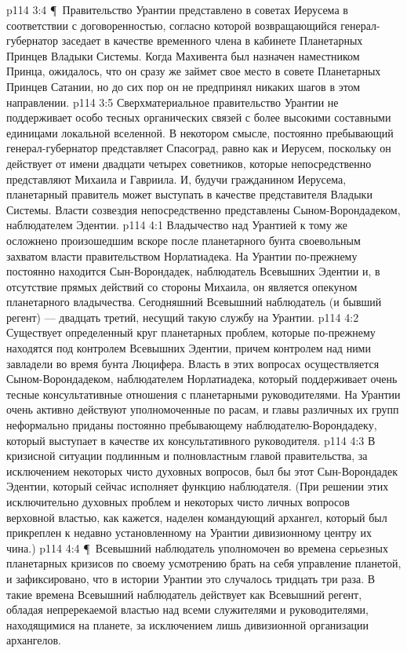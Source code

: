 \vs p114 3:4 \P\ Правительство Урантии представлено в советах Иерусема в соответствии с договоренностью, согласно которой возвращающийся генерал\hyp{}губернатор заседает в качестве временного члена в кабинете Планетарных Принцев Владыки Системы. Когда Махивента был назначен наместником Принца, ожидалось, что он сразу же займет свое место в совете Планетарных Принцев Сатании, но до сих пор он не предпринял никаких шагов в этом направлении.
\vs p114 3:5 Сверхматериальное правительство Урантии не поддерживает особо тесных органических связей с более высокими составными единицами локальной вселенной. В некотором смысле, постоянно пребывающий генерал\hyp{}губернатор представляет Спасоград, равно как и Иерусем, поскольку он действует от имени двадцати четырех советников, которые непосредственно представляют Михаила и Гавриила. И, будучи гражданином Иерусема, планетарный правитель может выступать в качестве представителя Владыки Системы. Власти созвездия непосредственно представлены Сыном\hyp{}Ворондадеком, наблюдателем Эдентии.
\vs p114 4:1 Владычество над Урантией к тому же осложнено произошедшим вскоре после планетарного бунта своевольным захватом власти правительством Норлатиадека. На Урантии по\hyp{}прежнему постоянно находится Сын\hyp{}Ворондадек, наблюдатель Всевышних Эдентии и, в отсутствие прямых действий со стороны Михаила, он является опекуном планетарного владычества. Сегодняшний Всевышний наблюдатель (и бывший регент) --- двадцать третий, несущий такую службу на Урантии.
\vs p114 4:2 Существует определенный круг планетарных проблем, которые по\hyp{}прежнему находятся под контролем Всевышних Эдентии, причем контролем над ними завладели во время бунта Люцифера. Власть в этих вопросах осуществляется Сыном\hyp{}Ворондадеком, наблюдателем Норлатиадека, который поддерживает очень тесные консультативные отношения с планетарными руководителями. На Урантии очень активно действуют уполномоченные по расам, и главы различных их групп неформально приданы постоянно пребывающему наблюдателю\hyp{}Ворондадеку, который выступает в качестве их консультативного руководителя.
\vs p114 4:3 В кризисной ситуации подлинным и полновластным главой правительства, за исключением некоторых чисто духовных вопросов, был бы этот Сын\hyp{}Ворондадек Эдентии, который сейчас исполняет функцию наблюдателя. (При решении этих исключительно духовных проблем и некоторых чисто личных вопросов верховной властью, как кажется, наделен командующий архангел, который был прикреплен к недавно установленному на Урантии дивизионному центру их чина.)
\vs p114 4:4 \P\ Всевышний наблюдатель уполномочен во времена серьезных планетарных кризисов по своему усмотрению брать на себя управление планетой, и зафиксировано, что в истории Урантии это случалось тридцать три раза. В такие времена Всевышний наблюдатель действует как Всевышний регент, обладая непререкаемой властью над всеми служителями и руководителями, находящимися на планете, за исключением лишь дивизионной организации архангелов.
